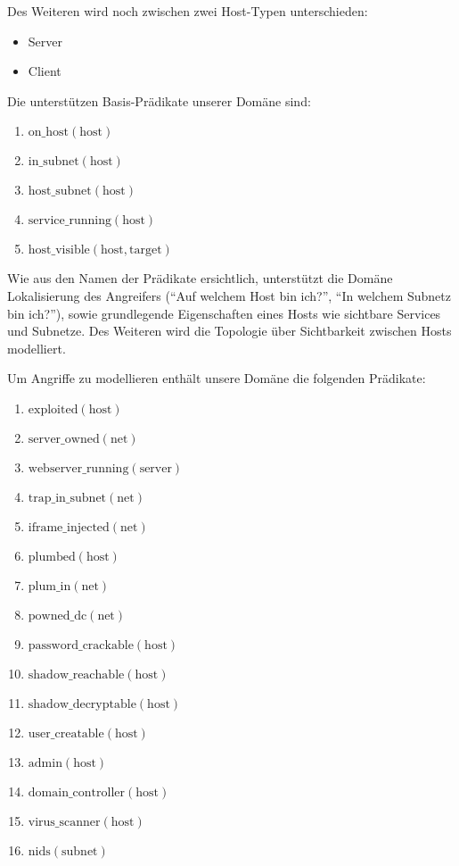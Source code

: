 Des Weiteren wird noch zwischen zwei Host-Typen unterschieden:

\begin{itemize}
  \item Server
  \item Client
\end{itemize}

Die unterstützen Basis-Prädikate unserer Domäne sind:

\begin{enumerate}
  \item $\text{on\_host}(\text{host})$
  \item $\text{in\_subnet}(\text{host})$
  \item $\text{host\_subnet}(\text{host})$
  \item $\text{service\_running}(\text{host})$
  \item $\text{host\_visible}(\text{host}, \text{target})$
\end{enumerate}

Wie aus den Namen der Prädikate ersichtlich, unterstützt die Domäne
Lokalisierung des Angreifers (\enquote{Auf welchem Host bin ich?},
\enquote{In welchem Subnetz bin ich?}), sowie grundlegende Eigenschaften
eines Hosts wie sichtbare Services und Subnetze. Des Weiteren wird die
Topologie über Sichtbarkeit zwischen Hosts modelliert.
                 
Um Angriffe zu modellieren enthält unsere Domäne die folgenden Prädikate:

\begin{enumerate}
  \item $\text{exploited}(\text{host})$
  \item $\text{server\_owned}(\text{net})$
  \item $\text{webserver\_running}(\text{server})$
  \item $\text{trap\_in\_subnet}(\text{net})$
  \item $\text{iframe\_injected}(\text{net})$
  \item $\text{plumbed}(\text{host})$
  \item $\text{plum\_in}(\text{net})$
  \item $\text{powned\_dc}(\text{net})$
  \item $\text{password\_crackable}(\text{host})$
  \item $\text{shadow\_reachable}(\text{host})$
  \item $\text{shadow\_decryptable}(\text{host})$
  \item $\text{user\_creatable}(\text{host})$
  \item $\text{admin}(\text{host})$
  \item $\text{domain\_controller}(\text{host})$
  \item $\text{virus\_scanner}(\text{host}) $
  \item $\text{nids}(\text{subnet})$
\end{enumerate} %
		    
